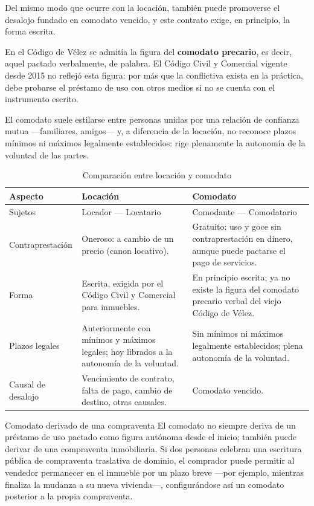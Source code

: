 \documentclass[12pt,oneside]{book}
\begin{document}
Del mismo modo que ocurre con la locación, también puede promoverse el desalojo fundado en comodato vencido, y este contrato exige, en principio, la forma escrita.

\begin{important}
En el Código de Vélez se admitía la figura del \textbf{comodato precario}, es decir, aquel pactado verbalmente, de palabra. El Código Civil y Comercial vigente desde 2015 no reflejó esta figura: por más que la conflictiva exista en la práctica, debe probarse el préstamo de uso con otros medios si no se cuenta con el instrumento escrito.
\end{important}

El comodato suele estilarse entre personas unidas por una relación de confianza mutua ---familiares, amigos--- y, a diferencia de la locación, no reconoce plazos mínimos ni máximos legalmente establecidos: rige plenamente la autonomía de la voluntad de las partes.

\begin{table}[H]
\centering
\caption{Comparación entre locación y comodato}
\begin{tabularx}{\textwidth}{>{\raggedright\arraybackslash}p{} X X}
\toprule
\textbf{Aspecto} & \textbf{Locación} & \textbf{Comodato} \\
\midrule
Sujetos & Locador --- Locatario & Comodante --- Comodatario \\
Contraprestación & Oneroso: a cambio de un precio (canon locativo). & Gratuito: uso y goce sin contraprestación en dinero, aunque puede pactarse el pago de servicios. \\
Forma & Escrita, exigida por el Código Civil y Comercial para inmuebles. & En principio escrita; ya no existe la figura del comodato precario verbal del viejo Código de Vélez. \\
Plazos legales & Anteriormente con mínimos y máximos legales; hoy librados a la autonomía de la voluntad. & Sin mínimos ni máximos legalmente establecidos; plena autonomía de la voluntad. \\
Causal de desalojo & Vencimiento de contrato, falta de pago, cambio de destino, otras causales. & Comodato vencido. \\
\bottomrule
\end{tabularx}
\end{table}

\begin{example}{Comodato derivado de una compraventa}
El comodato no siempre deriva de un préstamo de uso pactado como figura autónoma desde el inicio; también puede derivar de una compraventa inmobiliaria. Si dos personas celebran una escritura pública de compraventa traslativa de dominio, el comprador puede permitir al vendedor permanecer en el inmueble por un plazo breve ---por ejemplo, mientras finaliza la mudanza a su nueva vivienda---, configurándose así un comodato posterior a la propia compraventa.
\end{example}
\end{document}
